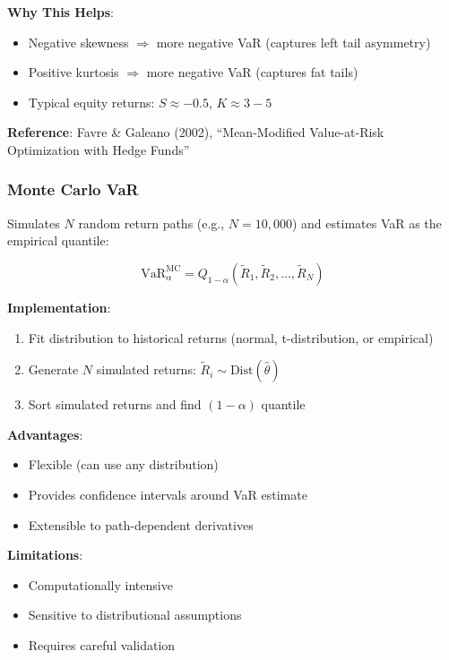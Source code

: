 \documentclass[12pt,a4paper]{article}
\begin{document}
\textbf{Why This Helps}:
\begin{itemize}
    \item Negative skewness $\Rightarrow$ more negative VaR (captures left tail asymmetry)
    \item Positive kurtosis $\Rightarrow$ more negative VaR (captures fat tails)
    \item Typical equity returns: $S \approx -0.5$, $K \approx 3-5$
\end{itemize}

\textbf{Reference}: Favre \& Galeano (2002), ``Mean-Modified Value-at-Risk Optimization with Hedge Funds''

\subsubsection{Monte Carlo VaR}

Simulates $N$ random return paths (e.g., $N=10{,}000$) and estimates VaR as the empirical quantile:

\begin{equation}
\text{VaR}_\alpha^{\text{MC}} = Q_{1-\alpha}(\tilde{R}_1, \tilde{R}_2, \ldots, \tilde{R}_N)
\end{equation}

\textbf{Implementation}:
\begin{enumerate}
    \item Fit distribution to historical returns (normal, t-distribution, or empirical)
    \item Generate $N$ simulated returns: $\tilde{R}_i \sim \text{Dist}(\hat{\theta})$
    \item Sort simulated returns and find $(1-\alpha)$ quantile
\end{enumerate}

\textbf{Advantages}:
\begin{itemize}
    \item Flexible (can use any distribution)
    \item Provides confidence intervals around VaR estimate
    \item Extensible to path-dependent derivatives
\end{itemize}

\textbf{Limitations}:
\begin{itemize}
    \item Computationally intensive
    \item Sensitive to distributional assumptions
    \item Requires careful validation
\end{itemize}
\end{document}
